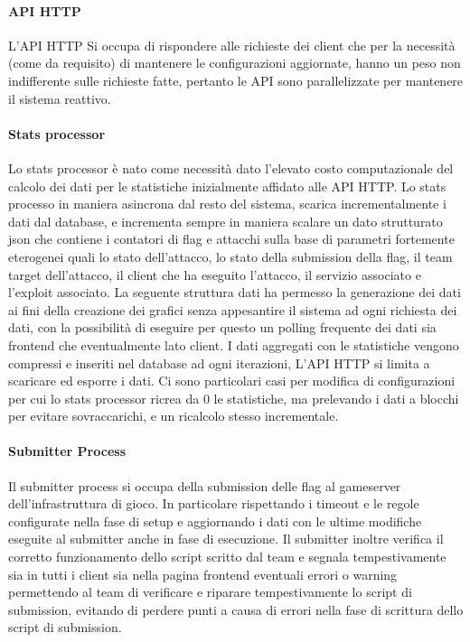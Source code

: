 \documentclass[11pt]{article}
\begin{document}
\paragraph{API HTTP}
L'API HTTP Si occupa di rispondere alle richieste dei client che per la necessità (come da requisito) di mantenere le configurazioni aggiornate, hanno un peso non indifferente sulle richieste fatte, pertanto le API sono parallelizzate per mantenere il sistema reattivo.
\paragraph{Stats processor}
Lo stats processor è nato come necessità dato l'elevato costo computazionale del calcolo dei dati per le statistiche inizialmente affidato alle API HTTP. Lo stats processo in maniera asincrona dal resto del sistema, scarica incrementalmente i dati dal database, e incrementa sempre in maniera scalare un dato strutturato json che contiene i contatori di flag e attacchi sulla base di parametri fortemente eterogenei quali lo stato dell'attacco, lo stato della submission della flag, il team target dell'attacco, il client che ha eseguito l'attacco, il servizio associato e l'exploit associato. La seguente struttura dati ha permesso la generazione dei dati ai fini della creazione dei grafici senza appesantire il sistema ad ogni richiesta dei dati, con la possibilità di eseguire per questo un polling frequente dei dati sia frontend che eventualmente lato client. I dati aggregati con le statistiche vengono compressi e inseriti nel database ad ogni iterazioni, L'API HTTP si limita a scaricare ed esporre i dati. Ci sono particolari casi per modifica di configurazioni per cui lo stats processor ricrea da 0 le statistiche, ma prelevando i dati a blocchi per evitare sovraccarichi, e un ricalcolo stesso incrementale.
\paragraph{Submitter Process}
Il submitter process si occupa della submission delle flag al gameserver dell'infrastruttura di gioco. In particolare rispettando i timeout e le regole configurate nella fase di setup e aggiornando i dati con le ultime modifiche eseguite al submitter anche in fase di esecuzione.
Il submitter inoltre verifica il corretto funzionamento dello script scritto dal team e segnala tempestivamente sia in tutti i client sia nella pagina frontend eventuali errori o warning permettendo al team di verificare e riparare tempestivamente lo script di submission, evitando di perdere punti a causa di errori nella fase di scrittura dello script di submission.
\end{document}

